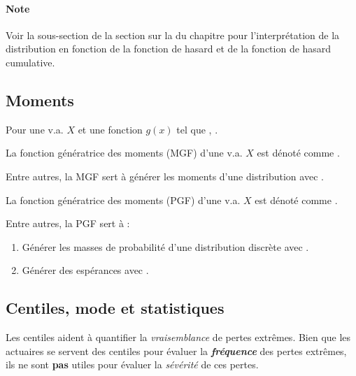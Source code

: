 \documentclass[french]{article}
\begin{document}
\begin{multicols*}{2}
\paragraph{Note}	Voir la sous-section \textit{\underline{}} de la section sur la \textit{\underline{}} du chapitre \textit{\underline{}} pour l'interprétation de la distribution en fonction de la fonction de hasard et de la fonction de hasard cumulative.



\columnbreak
\subsection{Moments}
Pour une v.a. $X$   et une fonction $g(x)$ tel que  , .

\begin{definitionNOHFILL}
La fonction génératrice des moments (MGF) d'une v.a. $X$ est dénoté comme .

\bigskip

Entre autres, la MGF sert à générer les moments d'une distribution avec .
\end{definitionNOHFILL}

\begin{definitionNOHFILL}
La fonction génératrice des moments (PGF) d'une v.a. $X$ est dénoté comme .

\bigskip

Entre autres, la PGF sert à :  
\begin{enumerate}
	\item	Générer les masses de probabilité d'une distribution discrète avec .
	\item	Générer des espérances avec .
\end{enumerate}
\end{definitionNOHFILL}



\columnbreak
\subsection{Centiles, mode et statistiques}
\begin{definitionNOHFILL}[Centile]
\begin{rappel_enhanced}[Contexte]
Les centiles aident à quantifier la \textit{vraisemblance} de pertes extrêmes. Bien que les actuaires se servent des centiles pour évaluer la \textit{\textbf{fréquence}} des pertes extrêmes, ils ne sont \textbf{pas} utiles pour évaluer la \textit{sévérité} de ces pertes.
\end{rappel_enhanced}


\end{definitionNOHFILL}
\end{multicols*}
\end{document}
